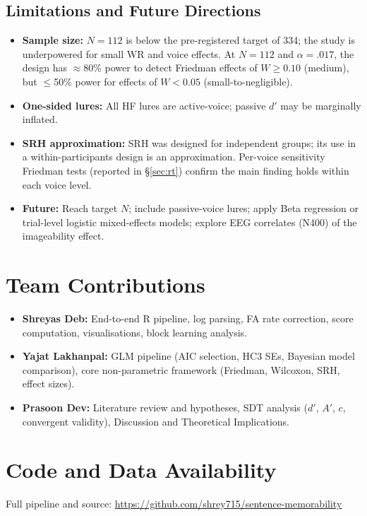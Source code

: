 \documentclass[12pt, a4paper]{article}
\begin{document}
\subsection{Limitations and Future Directions}

\begin{itemize}[noitemsep]
  \item \textbf{Sample size:} $N = 112$ is below the pre-registered
  target of 334; the study is underpowered for small WR and voice effects.
  At $N = 112$ and $\alpha = .017$, the design has $\approx$80\% power
  to detect Friedman effects of $W \geq 0.10$ (medium), but $\leq$50\%
  power for effects of $W < 0.05$ (small-to-negligible).
  \item \textbf{One-sided lures:} All HF lures are active-voice; passive
  $d'$ may be marginally inflated.
  \item \textbf{SRH approximation:} SRH was designed for independent
  groups; its use in a within-participants design is an approximation.
  Per-voice sensitivity Friedman tests (reported in §\ref{sec:rt})
  confirm the main finding holds within each voice level.
  \item \textbf{Future:} Reach target $N$; include passive-voice lures;
  apply Beta regression or trial-level logistic mixed-effects models;
  explore EEG correlates (N400) of the imageability effect.
\end{itemize}

\section*{Team Contributions}

\begin{itemize}[noitemsep]
  \item \textbf{Shreyas Deb:} End-to-end R pipeline, log parsing, FA
  rate correction, score computation, visualisations, block learning
  analysis.
  \item \textbf{Yajat Lakhanpal:} GLM pipeline (AIC selection, HC3 SEs,
  Bayesian model comparison), core non-parametric framework (Friedman,
  Wilcoxon, SRH, effect sizes).
  \item \textbf{Prasoon Dev:} Literature review and hypotheses, SDT
  analysis ($d'$, $A'$, $c$, convergent validity), Discussion and
  Theoretical Implications.
\end{itemize}

\section*{Code and Data Availability}

Full pipeline and source: \url{https://github.com/shrey715/sentence-memorability}

{\small


}
\end{document}
